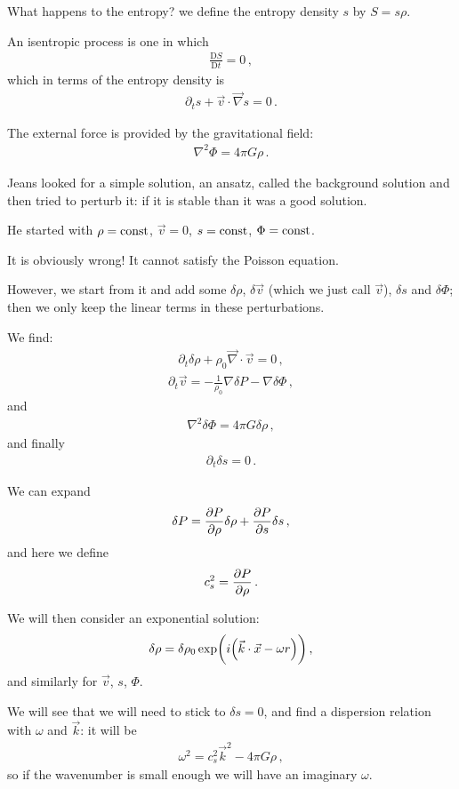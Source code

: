 \documentclass[main.tex]{subfiles}
\begin{document}
What happens to the entropy? we define the entropy density \(s \) by \(S  = s \rho \). 

An isentropic process is one in which 
%
\begin{align}
  \frac{ \mathrm{D} S}{\mathrm{D}t} = 0
\,,
\end{align}
%
which in terms of the entropy density is 
%
\begin{align}
  \partial_{t} s + \vec{v} \cdot \vec{\nabla} s = 0 
\,.
\end{align}
%

The external force is provided by the gravitational field: 
%
\begin{align}
  \nabla^2 \Phi = 4 \pi G \rho 
\,.
\end{align}

Jeans looked for a simple solution, an ansatz, called the background solution and then tried to perturb it: if it is stable than it was a good solution. 

He started with \(\rho = \text{const}\), \(\vec{v} = 0\), \(s = \text{const}\), \(\Phi = \text{const}\). 

It is obviously wrong! It cannot satisfy the Poisson equation. 

However, we start from it and add some \(\delta \rho \), \(\delta \vec{v}\) (which we just call \(\vec{v}\)), \(\delta s\) and \(\delta \Phi \); then we only keep the linear terms in these perturbations. 

We find: 
%
\begin{align}
  \partial_{t} \delta \rho  +
  \rho_0 \vec{\nabla} \cdot \vec{v} = 0 
\,,
\end{align}
%
%
\begin{align}
  \partial_{t} \vec{v} = - \frac{1}{\rho_0 } \nabla \delta P - \nabla \delta \Phi 
\,,
\end{align}
%
and 
%
\begin{align}
  \nabla^2 \delta \Phi = 4 \pi G \delta \rho 
\,,
\end{align}
%
and finally 
%
\begin{align}
  \partial_{t} \delta s = 0
\,.
\end{align}

We can expand
%
\begin{align}
  \delta P = \pdv{P}{\rho } \delta \rho + \pdv{P}{s} \delta s
\,,
\end{align}
%
and here we define 
%
\begin{align}
  c_s^2 = \pdv{P}{\rho }
\,. 
\end{align}

We will then consider an exponential solution: 
%
\begin{align}
  \delta \rho = \delta \rho_0 \exp(i \qty(\vec{k} \cdot \vec{x} - \omega r))
\,,
\end{align}
%
and similarly for \(\vec{v}\), \(s\), \(\Phi \). 

We will see that we will need to stick to \(\delta s =0\), and find a dispersion relation with \(\omega \) and \(\vec{k}\): it will be 
%
\begin{align}
  \omega^2 = c_s^2 \vec{k}^2 - 4 \pi G \rho 
\,,
\end{align}
%
so if the wavenumber is small enough we will have an imaginary \(\omega \). 
\end{document}
